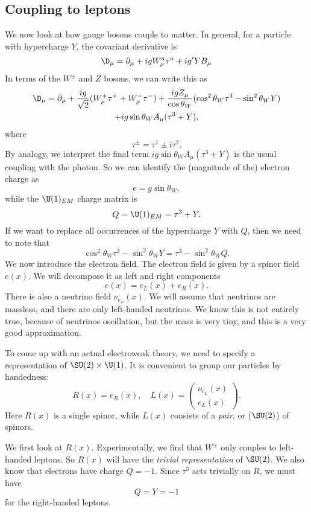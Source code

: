 \documentclass[a4paper]{article}
\begin{document}
\subsection{Coupling to leptons}
We now look at how gauge bosons couple to matter. In general, for a particle with hypercharge $Y$, the covariant derivative is
\[
  \D_\mu = \partial_\mu + i g W_\mu^a \tau^a + i g' Y B_\mu
\]
In terms of the $W^{\pm}$ and $Z$ bosons, we can write this as
\begin{multline*}
  \D_\mu = \partial_\mu + \frac{ig}{\sqrt{2}} (W_\mu^+ \tau^+ + W_\mu^- \tau^-) + \frac{ig Z_\mu}{\cos \theta_W} (\cos^2 \theta_W \tau^3 - \sin^2 \theta_W Y) \\
  + ig \sin \theta_W A_\mu (\tau^3 + Y),
\end{multline*}
where
\[
  \tau^{\pm} = \tau^1 \pm i \tau^2.
\]
By analogy, we interpret the final term $ig \sin \theta_W A_\mu (\tau^3 + Y)$ is the usual coupling with the photon. So we can identify the (magnitude of the) electron charge as
\[
  e = g \sin \theta_W,
\]
while the $\U(1)_{EM}$ charge matrix is
\[
  Q = \U(1)_{EM} = \tau^3 + Y.
\]
If we want to replace all occurrences of the hypercharge $Y$ with $Q$, then we need to note that
\[
  \cos^2 \theta_W \tau^3 - \sin^2 \theta_W Y = \tau^3 - \sin^2 \theta_W Q.
\]
We now introduce the electron field. The electron field is given by a spinor field $e(x)$. We will decompose it as left and right components
\[
  e(x) = e_L(x) + e_R(x).
\]
There is also a neutrino field $\nu_{e_L}(x)$. We will assume that neutrinos are massless, and there are only left-handed neutrinos. We know this is not entirely true, because of neutrinos oscillation, but the mass is very tiny, and this is a very good approximation.

To come up with an actual electroweak theory, we need to specify a representation of $\SU(2) \times \U(1)$. It is convenient to group our particles by handedness:
\[
  R(x) = e_R(x),\quad L(x) =
  \begin{pmatrix}
    \nu_{e_L}(x)\\
    e_L(x)
  \end{pmatrix}.
\]
Here $R(x)$ is a single spinor, while $L(x)$ consists of a \emph{pair}, or ($\SU(2)$)  of spinors.

We first look at $R(x)$. Experimentally, we find that $W^{\pm}$ only couples to left-handed leptons. So $R(x)$ will have the \emph{trivial representation} of $\SU(2)$. We also know that electrons have charge $Q = -1$. Since $\tau^3$ acts trivially on $R$, we must have
\[
  Q = Y = -1
\]
for the right-handed leptons.
\end{document}
